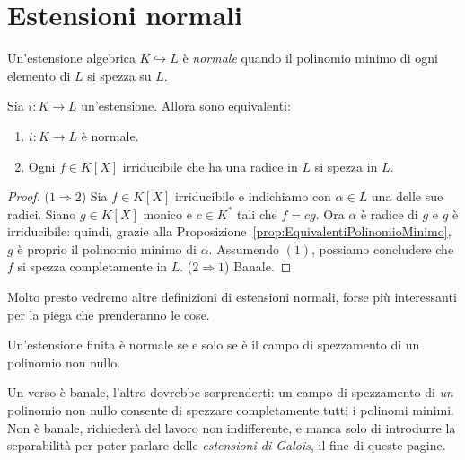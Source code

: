 
\section{Estensioni normali}

\begin{defi}
Un'estensione algebrica \(K \hookrightarrow L\) è {\em normale} quando il polinomio minimo di ogni elemento di \(L\) si spezza su \(L\).
\end{defi}


\begin{prop}\label{prop:EstensioniNormaliEquivalenti}
Sia \(i : K \to L\) un'estensione. Allora sono equivalenti:
\begin{enumerate}
\item \(i : K \to L\) è normale.
\item Ogni \(f \in K[X]\) irriducibile che ha una radice in \(L\) si spezza in \(L\). 
\end{enumerate}
\end{prop}

\begin{proof}
(\(1 \Rightarrow 2\)) Sia \(f \in K[X]\) irriducibile e indichiamo con \(\alpha \in L\) una delle sue radici. Siano \(g \in K[X]\) monico e \(c \in K^\ast\) tali che \(f = c g\). Ora \(\alpha\) è radice di \(g\) e \(g\) è irriducibile: quindi, grazie alla Proposizione~\ref{prop:EquivalentiPolinomioMinimo}, \(g\) è proprio il polinomio minimo di \(\alpha\). Assumendo \((1)\), possiamo concludere che \(f\) si spezza completamente in \(L\).\newline
(\(2 \Rightarrow 1\)) Banale.
\end{proof}


Molto presto vedremo altre definizioni di estensioni normali, forse più interessanti per la piega che prenderanno le cose.

\begin{prop}
Un'estensione finita è normale se e solo se è il campo di spezzamento di un polinomio non nullo.
\end{prop}

Un verso è banale, l'altro dovrebbe sorprenderti: un campo di spezzamento di {\em un} polinomio non nullo consente di spezzare completamente tutti i polinomi minimi. Non è banale, richiederà del lavoro non indifferente, e manca solo di introdurre la separabilità per poter parlare delle {\em estensioni di Galois}, il fine di queste pagine.

